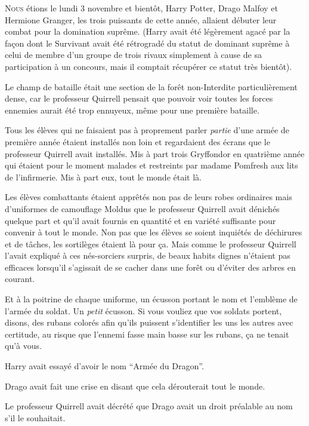 
\lettrine{N}{ous} étions le lundi 3 novembre et bientôt, Harry Potter, Drago Malfoy et Hermione Granger, les trois puissants de cette année, allaient débuter leur combat pour la domination suprême.
(Harry avait été légèrement agacé par la façon dont le Survivant avait été rétrogradé du statut de dominant suprême à celui de membre d'un groupe de trois rivaux simplement à cause de sa participation à un concours, mais il comptait récupérer ce statut très bientôt).

Le champ de bataille était une section de la forêt non-Interdite particulièrement dense, car le professeur Quirrell pensait que pouvoir voir toutes les forces ennemies aurait été trop ennuyeux, même pour une première bataille.

Tous les élèves qui ne faisaient pas à proprement parler \emph{partie} d'une armée de première année étaient installés non loin et regardaient des écrans que le professeur Quirrell avait installés.
Mis à part trois Gryffondor en quatrième année qui étaient pour le moment malades et restreints par madame Pomfresh aux lits de l'infirmerie.
Mis à part eux, tout le monde était là.

Les élèves combattants étaient apprêtés non pas de leurs robes ordinaires mais d'uniformes de camouflage Moldus que le professeur Quirrell avait dénichés quelque part et qu'il avait fournis en quantité et en variété suffisante pour convenir à tout le monde.
Non pas que les élèves se soient inquiétés de déchirures et de tâches, les sortilèges étaient là pour ça.
Mais comme le professeur Quirrell l'avait expliqué à ces nés-sorciers surpris, de beaux habits dignes n'étaient pas efficaces lorsqu'il s'agissait de se cacher dans une forêt ou d'éviter des arbres en courant.

Et à la poitrine de chaque uniforme, un écusson portant le nom et l'emblème de l'armée du soldat.
Un \emph{petit} écusson.
Si vous vouliez que vos soldats portent, disons, des rubans colorés afin qu'ils puissent s'identifier les uns les autres avec certitude, au risque que l'ennemi fasse main basse sur les rubans, ça ne tenait qu'à vous.

Harry avait essayé d'avoir le nom “Armée du Dragon”.

Drago avait fait une crise en disant que cela dérouterait tout le monde.

Le professeur Quirrell avait décrété que Drago avait un droit préalable au nom s'il le souhaitait.

